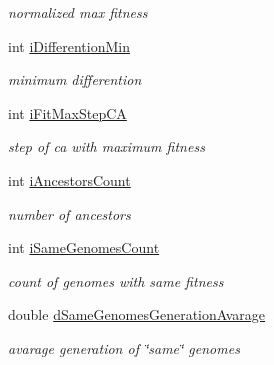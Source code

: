 \begin{DoxyCompactItemize}
\begin{DoxyCompactList}\small\item\em normalized max fitness \item\end{DoxyCompactList}\item 
\hypertarget{structstThreadCoreDataGA_a73d67951f3a75959f7d0e4f1276c41ee}{
int \hyperlink{structstThreadCoreDataGA_a73d67951f3a75959f7d0e4f1276c41ee}{iDifferentionMin}}
\label{structstThreadCoreDataGA_a73d67951f3a75959f7d0e4f1276c41ee}

\begin{DoxyCompactList}\small\item\em minimum differention \item\end{DoxyCompactList}\item 
\hypertarget{structstThreadCoreDataGA_ad4f9d27dd79b1f2dcea05b4ecfa3bd76}{
int \hyperlink{structstThreadCoreDataGA_ad4f9d27dd79b1f2dcea05b4ecfa3bd76}{iFitMaxStepCA}}
\label{structstThreadCoreDataGA_ad4f9d27dd79b1f2dcea05b4ecfa3bd76}

\begin{DoxyCompactList}\small\item\em step of ca with maximum fitness \item\end{DoxyCompactList}\item 
\hypertarget{structstThreadCoreDataGA_a59d0be9c562f12007c829b74535041ab}{
int \hyperlink{structstThreadCoreDataGA_a59d0be9c562f12007c829b74535041ab}{iAncestorsCount}}
\label{structstThreadCoreDataGA_a59d0be9c562f12007c829b74535041ab}

\begin{DoxyCompactList}\small\item\em number of ancestors \item\end{DoxyCompactList}\item 
\hypertarget{structstThreadCoreDataGA_a12f36550737867cb39f31bd10a2bab51}{
int \hyperlink{structstThreadCoreDataGA_a12f36550737867cb39f31bd10a2bab51}{iSameGenomesCount}}
\label{structstThreadCoreDataGA_a12f36550737867cb39f31bd10a2bab51}

\begin{DoxyCompactList}\small\item\em count of genomes with same fitness \item\end{DoxyCompactList}\item 
\hypertarget{structstThreadCoreDataGA_a9e8c86589315dd18e1152f822ffa4443}{
double \hyperlink{structstThreadCoreDataGA_a9e8c86589315dd18e1152f822ffa4443}{dSameGenomesGenerationAvarage}}
\label{structstThreadCoreDataGA_a9e8c86589315dd18e1152f822ffa4443}

\begin{DoxyCompactList}\small\item\em avarage generation of \char`\"{}same\char`\"{} genomes \item\end{DoxyCompactList}\end{DoxyCompactItemize}


